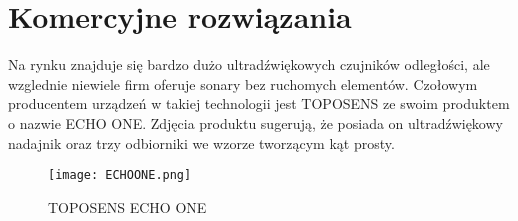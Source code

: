 \section{Komercyjne rozwiązania}
Na rynku znajduje się bardzo dużo ultradźwiękowych czujników odległości, ale wzglednie niewiele firm oferuje sonary bez ruchomych elementów.
Czołowym producentem urządzeń w takiej technologii jest TOPOSENS ze swoim produktem o nazwie ECHO ONE\textregistered.
Zdjęcia produktu sugerują, że posiada on ultradźwiękowy nadajnik oraz trzy odbiorniki we wzorze tworzącym kąt prosty.

\begin{figure}[ht!]
    \centering
    \texttt{[image: ECHOONE.png]}
    \caption{TOPOSENS ECHO ONE}
    \label{fig:echoone}
\end{figure}

